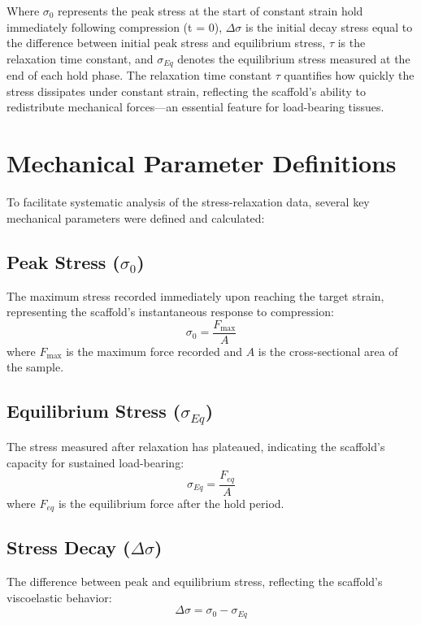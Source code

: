 \noindent Where $\sigma_{0}$ represents the peak stress at the start of constant strain hold immediately following compression (t = 0), $\Delta\sigma$ is the initial decay stress equal to the difference between initial peak stress and equilibrium stress, $\tau$ is the relaxation time constant, and $\sigma_{Eq}$ denotes the equilibrium stress measured at the end of each hold phase. The relaxation time constant $\tau$ quantifies how quickly the stress dissipates under constant strain, reflecting the scaffold's ability to redistribute mechanical forces—an essential feature for load-bearing tissues.

\section{Mechanical Parameter Definitions}
To facilitate systematic analysis of the stress-relaxation data, several key mechanical parameters were defined and calculated:

\subsection{Peak Stress ($\sigma_0$)}
The maximum stress recorded immediately upon reaching the target strain, representing the scaffold's instantaneous response to compression:
\begin{equation}
\sigma_0 = \frac{F_{\max}}{A}
\end{equation}
where $F_{\max}$ is the maximum force recorded and $A$ is the cross-sectional area of the sample.

\subsection{Equilibrium Stress ($\sigma_{Eq}$)}
The stress measured after relaxation has plateaued, indicating the scaffold's capacity for sustained load-bearing:
\begin{equation}
\sigma_{Eq} = \frac{F_{eq}}{A}
\end{equation}
where $F_{eq}$ is the equilibrium force after the hold period.

\subsection{Stress Decay ($\Delta\sigma$)}
The difference between peak and equilibrium stress, reflecting the scaffold's viscoelastic behavior:
\begin{equation}
\Delta\sigma = \sigma_0 - \sigma_{Eq}
\end{equation}

